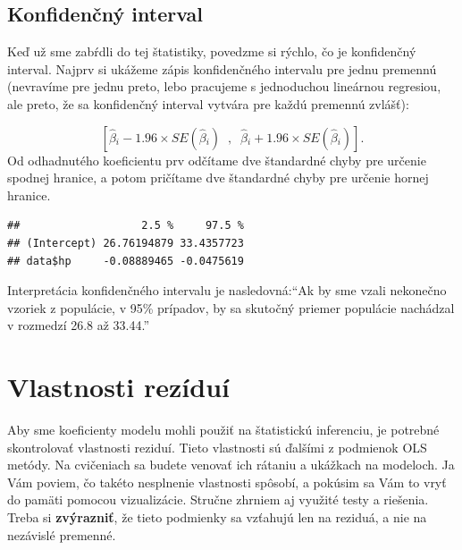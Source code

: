 \hypertarget{konfidenux10dnuxfd-interval}{%
\subsection{Konfidenčný interval}\label{konfidenux10dnuxfd-interval}}

Keď už sme zabŕdli do tej štatistiky, povedzme si rýchlo, čo je
konfidenčný interval. Najprv si ukážeme zápis konfidenčného intervalu
pre jednu premennú (nevravíme pre jednu preto, lebo pracujeme s
jednoduchou lineárnou regresiou, ale preto, že sa konfidenčný interval
vytvára pre každú premennú zvlášť):

\[[\hat\beta{}_i - 1.96 × SE(\hat\beta{}_i)\;\;,\;\;\hat\beta{}_i + 1.96 × SE(\hat\beta{}_i)].\]
Od odhadnutého koeficientu prv odčítame dve štandardné chyby pre určenie
spodnej hranice, a potom pričítame dve štandardné chyby pre určenie
hornej hranice.

\begin{Shaded}
\begin{Highlighting}[]

\end{Highlighting}
\end{Shaded}

\begin{verbatim}
##                   2.5 %     97.5 %
## (Intercept) 26.76194879 33.4357723
## data$hp     -0.08889465 -0.0475619
\end{verbatim}

Interpretácia konfidenčného intervalu je nasledovná:``Ak by sme vzali
nekonečno vzoriek z populácie, v 95\% prípadov, by sa skutočný priemer
populácie nachádzal v rozmedzí 26.8 až 33.44.''

\newpage

\hypertarget{vlastnosti-reziduuxed}{%
\section{Vlastnosti rezíduí}\label{vlastnosti-reziduuxed}}

Aby sme koeficienty modelu mohli použiť na štatistickú inferenciu, je
potrebné skontrolovať vlastnosti reziduí. Tieto vlastnosti sú ďalšími z
podmienok OLS metódy. Na cvičeniach sa budete venovať ich rátaniu a
ukážkach na modeloch. Ja Vám poviem, čo takéto nesplnenie vlastnosti
spôsobí, a pokúsim sa Vám to vryť do pamäti pomocou vizualizácie.
Stručne zhrniem aj využité testy a riešenia. Treba si
\textbf{zvýrazniť}, že tieto podmienky sa vzťahujú len na reziduá, a nie
na nezávislé premenné.


